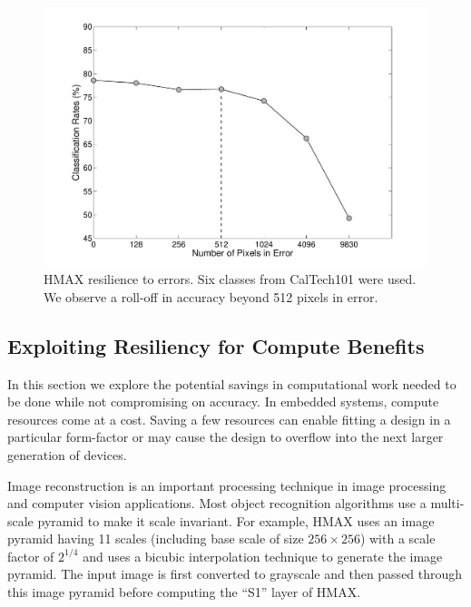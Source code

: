 \begin{figure}[htb!]
\vspace{0pt}
\centering
\includegraphics[width=1\linewidth,trim={20 20 30 20}, clip]{./figures/PixelSensitivityAnalysis.pdf}
\vspace{0pt}
\caption{HMAX resilience to errors. Six classes from CalTech101 were used. We observe a roll-off in accuracy beyond 512 pixels in error.}\label{fig:hmax_pixel_sensitivity}
\vspace{0pt}
\end{figure}

\subsection{Exploiting Resiliency for Compute Benefits}
In this section we explore the potential savings in computational work needed to be done while not compromising on accuracy. 
In embedded systems, compute resources come at a cost. Saving a few resources can enable 
fitting a design in a particular form-factor or may cause the design to overflow into the next larger generation of devices. 

Image reconstruction is an important processing technique in image processing and computer vision applications. Most object recognition algorithms use a multi-scale 
pyramid to make it scale invariant. For example, HMAX uses an image pyramid having 11 scales (including base scale of size $256\times256$) with a 
scale factor of $2^{1/4}$ and uses a bicubic interpolation technique 
to generate the image pyramid. The input image is first converted to grayscale and then passed through this image pyramid before computing the ``S1'' layer of HMAX. 

